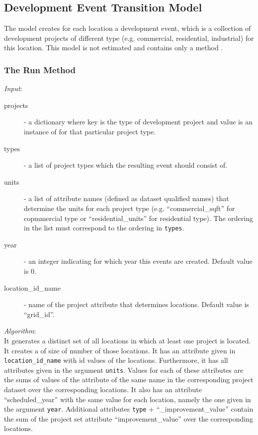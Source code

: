 %
\subsection{Development Event Transition Model}
%
\label{sec:development-event-transition-model}
%
The model  
creates for each location a development event, which is a collection
of development projects of different type (e.g. commercial, residential,
industrial) for this location. This model is not estimated and contains only a
method .

%
\subsubsection{The Run Method}
%
{\it Input}:
\begin{description}
\item[projects] - a dictionary where key is the type of development
  project and value is an instance of  for that
  particular project type.
\item[types] - a list of project types which the resulting event should
  consist of.
\item[units] - a list of attribute  names (defined as dataset qualified names)
  that determine the units for each project type (e.g. ``commercial_sqft'' for
  copmmercial type or ``residential_units'' for residential type). The
  ordering in the list must correspond to the ordering in \verb|types|.
\item[year] - an integer indicating for which year this events are
  created. Default value is 0.
\item[location_id_name] - name of the project attribute that determines
  locations. Default value is ``grid_id''.
\end{description}

{\it Algorithm}:\\[1mm]
It generates a distinct set of all locations in which at least one project is
located. It creates a  of size of number of those
locations. It has an attribute given in \verb|location_id_name| with id values
of the locations. Furthermore, it has all attributes  given in the argument
\verb|units|. Values for each of these attributes  are the sums of values of the
attribute of the same name in the corresponding project dataset over the
corresponding locations. It also has an attribute  ``scheduled_year'' with the
same value for each location, namely the one given in the argument
\verb|year|. Additional attributes \verb|type| + ``_improvement_value''
contain the sum of the project set attribute ``improvement_value'' over the
corresponding locations.

